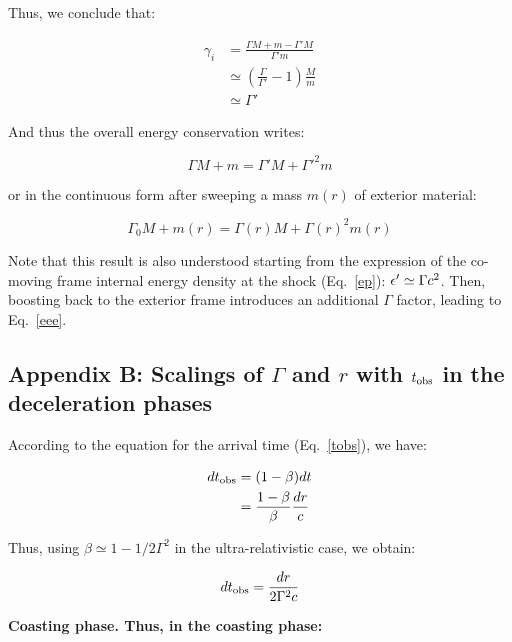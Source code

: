 Thus, we conclude that:

\begin{align}
    \gamma_i &= \frac{\Gamma M + m - \Gamma'M}{\Gamma'm} \\
             &\simeq \left( \frac{\Gamma}{\Gamma'} -1 \right)\frac{M}{m}\\
             &\simeq \Gamma'
\end{align}

And thus the overall energy conservation writes:

\begin{equation}
    \label{eee}
    \Gamma M + m = \Gamma'M + \Gamma'^2 m
\end{equation}

or in the continuous form after sweeping a mass $m(r)$ of exterior material:

\begin{equation}\Gamma_0 M + m(r) = \Gamma(r) M + \Gamma(r)^2 m(r) \end{equation}

Note that this result is also understood starting from the expression of the co-moving frame internal energy density at the shock (Eq.~\ref{ep}): $\epsilon^{\prime} \simeq \Gamma c^2$. Then, boosting back to the exterior frame introduces an additional $
\Gamma$ factor, leading to Eq.~\ref{eee}.


\subsection*{Appendix B: Scalings of $\Gamma$ and $r$ with $t_{\mathrm{obs}}$ in the deceleration phases}

According to the equation for the arrival time (Eq.~\ref{tobs}), we have:

\begin{align}
    dt_{\mathrm{obs}} &= (1 - \beta) dt \\
           &= \frac{1 - \beta}{\beta} \frac{dr}{c}
\end{align}

Thus, using $\beta \simeq 1 - 1/2\Gamma^2$ in the ultra-relativistic case, we obtain:

\begin{equation}dt_{\mathrm{obs}} = \frac{dr}{2\Gamma^2 c} \end{equation}

\bf{Coasting phase.} Thus, in the coasting phase:

